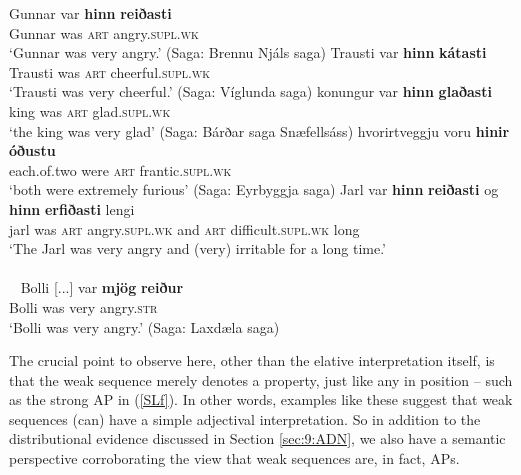 \documentclass[output=paper,colorlinks,citecolor=brown]{langscibook}
\begin{document}
\begin{exe}
\ex \label{SL}   
    \begin{xlist}
         \ex \label{SLa} \gll   Gunnar var \textbf{hinn} \textbf{reiðasti}  \\ 
           Gunnar was \textsc{art} angry.\textsc{supl.wk}  \\ 
           \glt `Gunnar was  very   angry.'   (Saga: Brennu Njáls saga)
         \ex\gll  Trausti  var \textbf{hinn} \textbf{kátasti} \\ 
          Trausti was \textsc{art} cheerful.\textsc{supl.wk} \\ 
          \glt `Trausti was  very   cheerful.'  (Saga: Víglunda saga)
          \ex\gll   konungur var \textbf{hinn}  \textbf{glaðasti} \\ 
          king was \textsc{art} glad.\textsc{supl.wk}  \\ 
          \glt`the king was  very   glad'   (Saga: Bárðar saga Snæfellsáss)
         \ex \label{SLd}  \gll   hvorirtveggju voru \textbf{hinir} \textbf{óðustu}  \\ 
         each.of.two were \textsc{art} frantic.\textsc{supl.wk} \\ 
         \glt `both were extremely furious'    (Saga: Eyrbyggja saga)
          \ex \label{SLe}  \gll  Jarl var   \textbf{hinn}  \textbf{reiðasti} og \textbf{hinn}  \textbf{erfiðasti} lengi   \\ 
           jarl was \textsc{art} angry.\textsc{supl.wk} and \textsc{art} difficult.\textsc{supl.wk} long \\
           \glt `The Jarl was  very   angry and (very) irritable for a long time.' \\ 
            \\  \
         \ex \label{SLf}  Bolli [...] var \textbf{mjög} \textbf{reiður}   \\ 
         { } Bolli {} was very angry.\textsc{str} \\
         \glt  `Bolli was very angry.' (Saga: Laxdæla saga)
\end{xlist} 
\end{exe}  


The crucial point to observe here, other than the elative interpretation itself, is that the weak sequence merely denotes a property,  just like any  in  position -- such as the strong AP in (\ref{SLf}).  In other words, examples like these suggest that weak sequences (can) have a simple adjectival interpretation. So in addition to the distributional evidence discussed in Section  \ref{sec:9:ADN}, we also have a semantic perspective corroborating the view that weak sequences are, in fact, APs.
\end{document}
